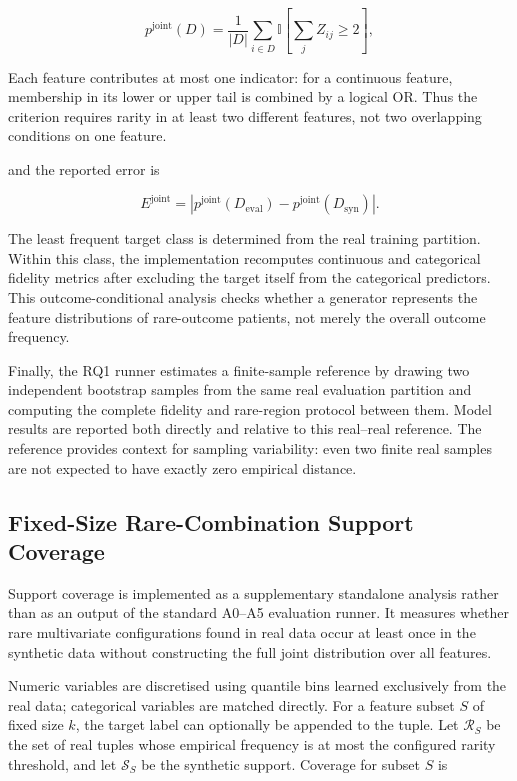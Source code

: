 \begin{equation}
    p^{\mathrm{joint}}(D) = \frac{1}{|D|}
        \sum_{i\in D}\mathbb{I}\!\left[\sum_j Z_{ij}\ge 2\right],
    \label{eq:evaluation_joint_rare_mass}
\end{equation}

Each feature contributes at most one indicator: for a continuous feature,
membership in its lower or upper tail is combined by a logical OR. Thus the
criterion requires rarity in at least two different features, not two
overlapping conditions on one feature.

and the reported error is

\begin{equation}
    E^{\mathrm{joint}} = \left|
        p^{\mathrm{joint}}(D_{\mathrm{eval}})
        -p^{\mathrm{joint}}(D_{\mathrm{syn}})\right|.
    \label{eq:evaluation_joint_rare_error}
\end{equation}

The least frequent target class is determined from the real training
partition. Within this class, the implementation recomputes continuous and
categorical fidelity metrics after excluding the target itself from the
categorical predictors. This outcome-conditional analysis checks whether a
generator represents the feature distributions of rare-outcome patients, not
merely the overall outcome frequency.

Finally, the RQ1 runner estimates a finite-sample reference by drawing two
independent bootstrap samples from the same real evaluation partition and
computing the complete fidelity and rare-region protocol between them. Model
results are reported both directly and relative to this real--real reference.
The reference provides context for sampling variability: even two finite real
samples are not expected to have exactly zero empirical distance.

\subsection{Fixed-Size Rare-Combination Support Coverage}
\label{subsec:support_coverage}

Support coverage is implemented as a supplementary standalone analysis rather
than as an output of the standard A0--A5 evaluation runner. It measures whether
rare multivariate configurations found in real data occur at least once in the
synthetic data without constructing the full joint distribution over all
features.

Numeric variables are discretised using quantile bins learned exclusively from
the real data; categorical variables are matched directly. For a feature
subset $S$ of fixed size $k$, the target label can optionally be appended to
the tuple. Let $\mathcal{R}_S$ be the set of real tuples whose empirical
frequency is at most the configured rarity threshold, and let
$\mathcal{S}_S$ be the synthetic support. Coverage for subset $S$ is

